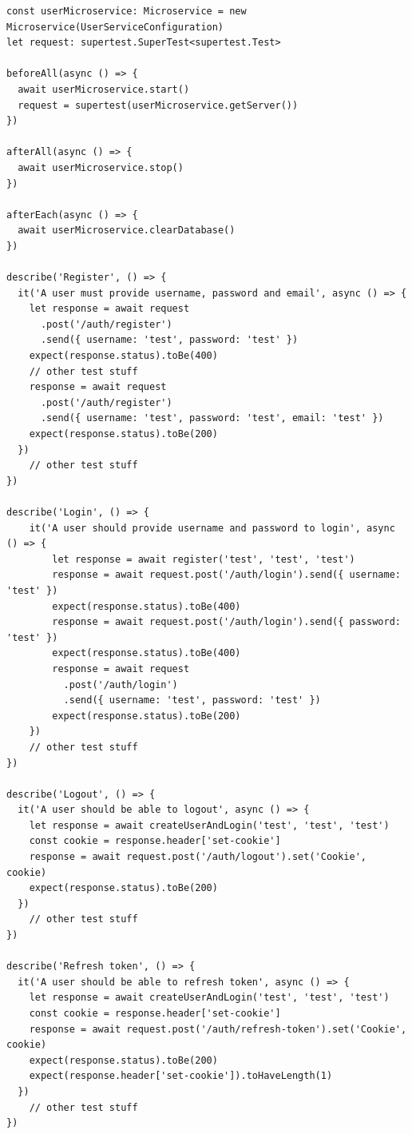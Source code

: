 \begin{lstlisting}[style=typescript, caption={microservice Test}, label=lst:login:route:test]
const userMicroservice: Microservice = new Microservice(UserServiceConfiguration)
let request: supertest.SuperTest<supertest.Test>

beforeAll(async () => {
  await userMicroservice.start()
  request = supertest(userMicroservice.getServer())
})

afterAll(async () => {
  await userMicroservice.stop()
})

afterEach(async () => {
  await userMicroservice.clearDatabase()
})

describe('Register', () => {
  it('A user must provide username, password and email', async () => {
    let response = await request
      .post('/auth/register')
      .send({ username: 'test', password: 'test' })
    expect(response.status).toBe(400)
    // other test stuff
    response = await request
      .post('/auth/register')
      .send({ username: 'test', password: 'test', email: 'test' })
    expect(response.status).toBe(200)
  })
    // other test stuff
})

describe('Login', () => {
    it('A user should provide username and password to login', async () => {
        let response = await register('test', 'test', 'test')
        response = await request.post('/auth/login').send({ username: 'test' })
        expect(response.status).toBe(400)
        response = await request.post('/auth/login').send({ password: 'test' })
        expect(response.status).toBe(400)
        response = await request
          .post('/auth/login')
          .send({ username: 'test', password: 'test' })
        expect(response.status).toBe(200)
    })
    // other test stuff
})

describe('Logout', () => {
  it('A user should be able to logout', async () => {
    let response = await createUserAndLogin('test', 'test', 'test')
    const cookie = response.header['set-cookie']
    response = await request.post('/auth/logout').set('Cookie', cookie)
    expect(response.status).toBe(200)
  })
    // other test stuff
})

describe('Refresh token', () => {
  it('A user should be able to refresh token', async () => {
    let response = await createUserAndLogin('test', 'test', 'test')
    const cookie = response.header['set-cookie']
    response = await request.post('/auth/refresh-token').set('Cookie', cookie)
    expect(response.status).toBe(200)
    expect(response.header['set-cookie']).toHaveLength(1)
  })
    // other test stuff
})

\end{lstlisting}

